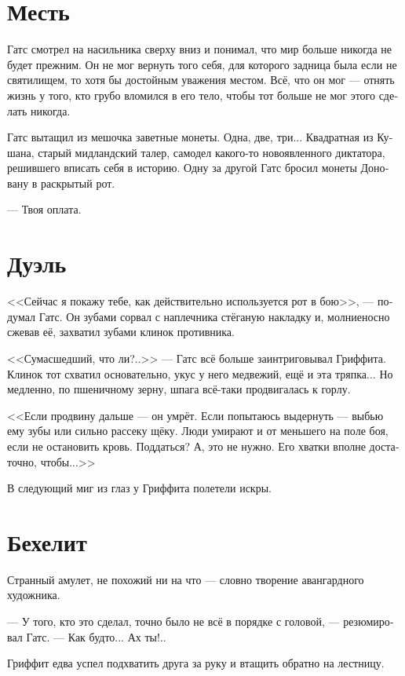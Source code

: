\documentclass[a4paper,12pt,fleqn]{book}\usepackage{polyglossia}\setdefaultlanguage[babelshorthands=true]{russian}\setotherlanguage{english}\defaultfontfeatures{Ligatures=TeX,Mapping=tex-text}\usepackage{xcolor}\newcommand{\ml}[3]{#2}
\begin{document}
\section{Месть}

Гатс смотрел на насильника сверху вниз и понимал, что мир больше никогда не будет прежним.
Он не мог вернуть того себя, для которого задница была если не святилищем, то хотя бы достойным уважения местом.
Всё, что он мог --- отнять жизнь у того, кто грубо вломился в его тело, чтобы тот больше не мог этого сделать никогда.

Гатс вытащил из мешочка заветные монеты.
Одна, две, три...
Квадратная из Кушана, старый мидландский талер, самодел какого-то новоявленного диктатора, решившего вписать себя в историю.
Одну за другой Гатс бросил монеты Доновану в раскрытый рот.

--- Твоя оплата.

\section{Дуэль}

<<Сейчас я покажу тебе, как действительно используется рот в бою>>, --- подумал Гатс.
Он зубами сорвал с наплечника стёганую накладку и, молниеносно сжевав её, захватил зубами клинок противника.

<<Сумасшедший, что ли?..>> --- Гатс всё больше заинтриговывал Гриффита.
Клинок тот схватил основательно, укус у него медвежий, ещё и эта тряпка...
Но медленно, по пшеничному зерну, шпага всё-таки продвигалась к горлу.

<<Если продвину дальше --- он умрёт.
Если попытаюсь выдернуть --- выбью ему зубы или сильно рассеку щёку.
Люди умирают и от меньшего на поле боя, если не остановить кровь.
Поддаться?
А, это не нужно.
Его хватки вполне достаточно, чтобы...>>

В следующий миг из глаз у Гриффита полетели искры.

\section{Бехелит}

Странный амулет, не похожий ни на что --- словно творение авангардного художника.

--- У того, кто это сделал, точно было не всё в порядке с головой, --- резюмировал Гатс.
--- Как будто...
Ах ты!..

Гриффит едва успел подхватить друга за руку и втащить обратно на лестницу.
\end{document}
